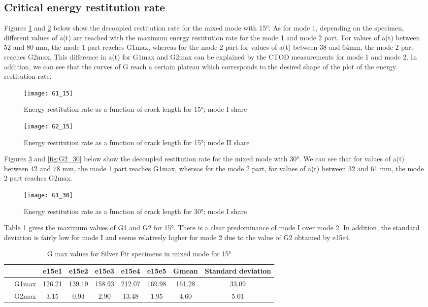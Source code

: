 \subsection{Critical energy restitution rate}

Figures \ref{fig:G1_15} and \ref{fig:G2_15} below show the decoupled restitution rate for the mixed mode with 15°.
As for mode 1, depending on the specimen, different values of a(t) are reached with the maximum energy restitution rate for the mode 1 and mode 2 part. For values of a(t) between 52 and 80 mm, the mode 1 part reaches G1max, whereas for the mode 2 part for values of a(t) between 38 and 64mm, the mode 2 part reaches G2max. This difference in a(t) for G1max and G2max can be explained by the CTOD measurements for mode 1 and mode 2.
In addition, we can see that the curves of G reach a certain plateau which corresponds to the desired shape of the plot of the energy restitution rate.

\begin{figure}[htp]
	\centering
	\texttt{[image: G1\_15]}
	\caption{Energy restitution rate as a function of crack length for 15°; mode I share}
	\label{fig:G1_15}
\end{figure}

\begin{figure}[htp]
	\centering
	\texttt{[image: G2\_15]}
	\caption{Energy restitution rate as a function of crack length for 15°; mode II share}
	\label{fig:G2_15}
\end{figure}

Figures \ref{fig:G1_30} and \ref{fig:G2_30} below show the decoupled restitution rate for the mixed mode with 30°.
We can see that for values of a(t) between 42 and 78 mm, the mode 1 part reaches G1max, whereas for the mode 2 part, for values of a(t) between 32 and 61 mm, the mode 2 part reaches G2max. 

\begin{figure}[htp]
	\centering
	\texttt{[image: G1\_30]}
	\caption{Energy restitution rate as a function of crack length for 30°; mode I share}
	\label{fig:G1_30}
\end{figure}

Table \ref{fig:tableG15} gives the maximum values of G1 and G2 for 15°. There is a clear predominance of mode I over mode 2. In addition, the standard deviation is fairly low for mode I and seems relatively higher for mode 2 due to the value of G2 obtained by e15e4.

\begin{table} [H]
	\centering
	\begin{tabular}{ccccccccc}
		\toprule %
		&  & e15e1 & e15e2 & e15e3 & e15e4 & e15e5 & Gmean & Standard deviation\\\midrule
		& G1max & 126.21 & 139.19 & 158.93 & 212.07 & 169.98 & 161.28 & 33.09 \\\midrule
		& G2max & 3.15 & 0.93 & 2.90 & 13.48 & 1.95 & 4.60 & 5.01\\\midrule
	\end{tabular}
	\caption{G max values for Silver Fir specimens in mixed mode for 15°}
	\label{fig:tableG15}
\end{table}

